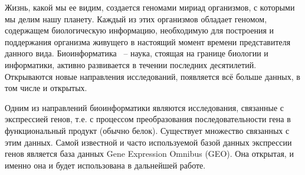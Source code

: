 \documentclass[times,specification,annotation]{itmo-student-thesis}
\begin{document}





\tableofcontents

\startprefacepage

Жизнь, какой мы ее видим, создается геномами мириад организмов, с которыми мы делим нашу планету. Каждый из этих организмов обладает геномом, содержащем биологическую информацию, необходимую для построения и поддержания организма живущего в настоящий момент времени представителя данного вида.\cite{Introduction} Биоинформатика ~-- наука, стоящая на границе биологии и информатики, активно развивается в течении последних десятилетий. Открываются новые направления исследований, появляется всё больше данных, в том числе и открытых.

Одним из направлений биоинформатики являются исследования, связанные с экспрессией генов, т.е. с процессом преобразования последовательности гена в функциональный продукт (обычно белок). Существует множество связанных с этим данных. Самой известной и часто используемой базой данных экспрессии генов является база данных ​Gene Expression Omnibus (GEO). Она открытая, и именно она и будет использована в дальнейшей работе. 
\end{document}
